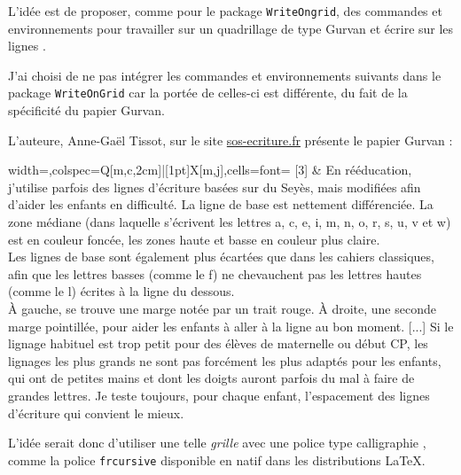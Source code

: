\documentclass[a4paper]{article}
\begin{document}
L'idée est de proposer, comme pour le package \texttt{WriteOngrid}, des \textsf{commandes} et \textsf{environnements} pour travailler sur un quadrillage de type Gurvan et écrire \og sur les lignes \fg.

\smallskip

J'ai choisi de ne pas intégrer les commandes et environnements suivants dans le package \texttt{WriteOnGrid} car la portée de celles-ci est différente, du fait de la spécificité du papier Gurvan.

\medskip

L'auteure, Anne-Gaël Tissot, sur le site \href{http://www.sos-ecriture.fr/2012/09/lignages-decriture-agrandis.html}{sos-ecriture.fr} présente le papier Gurvan :

\medskip

\begin{tblr}{width=\linewidth,colspec={Q[m,c,2cm]|[1pt]X[m,j]},cells={font=\small\sffamily}}
	\scalebox{3}[3]{\faBookReader} & {En rééducation, j'utilise parfois des lignes d'écriture basées sur du Seyès, mais modifiées afin d'aider les enfants en difficulté. La ligne de base est nettement différenciée. La zone médiane (dans laquelle s'écrivent les lettres a, c, e, i, m, n, o, r, s, u, v et w) est en couleur foncée, les zones haute et basse en couleur plus claire. \\ Les lignes de base sont également plus écartées que dans les cahiers classiques, afin que les lettres basses (comme le f) ne chevauchent pas les lettres hautes (comme le l) écrites à la ligne du dessous. \\
	À gauche, se trouve une marge notée par un trait rouge. À droite, une seconde marge pointillée, pour aider les enfants à aller à la ligne au bon moment. [...] Si le lignage habituel est trop petit pour des élèves de maternelle ou début CP, les lignages les plus grands ne sont pas forcément les plus adaptés pour les enfants, qui ont de petites mains et dont les doigts auront parfois du mal à faire de grandes lettres. Je teste toujours, pour chaque enfant, l'espacement des lignes d'écriture qui convient le mieux.} \\
\end{tblr}

\medskip

L'idée serait donc d'utiliser une telle \textit{grille} avec une police type \og calligraphie \fg, comme la police \texttt{frcursive} disponible en natif dans les distributions \LaTeX.

\medskip
\end{document}
